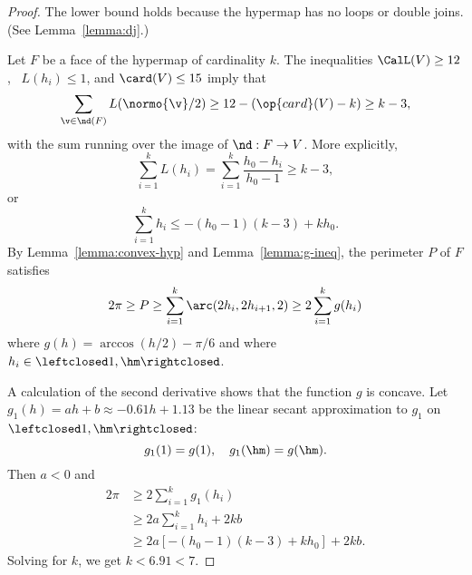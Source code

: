 \begin{proof} The lower bound holds because the hypermap has no loops
  or double joins.  (See Lemma~\ref{lemma:dj}.)  

Let $F$ be a face of the
  hypermap of cardinality $k$.  The inequalities $\CalL(V)\ge 12$,
 ~$L(h_i)\le1$, and $\card(V)\le 15$ 
imply that
\begin{equation}\label{eqn:L7}
\sum_{\v\in \nd(F)} L(\normo{\v}/2) \ge 12-(\op{card}(V)-k)\ge k-3,
\end{equation}
with the sum  running over the image of $\nd:F\to V$.
More explicitly,
\[
\sum_{i=1}^k L(h_i) = \sum_{i=1}^k \dfrac{h_0-h_i}{h_0-1} \ge k - 3,
\]
or
\[
\sum_{i=1}^k h_i \le -(h_0-1) (k-3) + k h_0.
\]
By Lemma~\ref{lemma:convex-hyp} and Lemma~\ref{lemma:g-ineq},
the perimeter $P$ of $F$ satisfies
\[
2\pi\ge P\ge
\sum_{i=1}^k \arc(2h_i,2h_{i+1},2)\ge 2\sum_{i=1}^k g(h_i)
\]
where $g(h) = \arccos(h/2)-\pi/6$ and
where $h_i\in \leftclosed 1,\hm\rightclosed$.

A calculation of the second derivative shows that the function $g$ is concave.
Let $g_1(h) = a h + b\approx -0.61 h + 1.13$ 
be the linear secant approximation to $g_1$ on 
$\leftclosed 1,\hm\rightclosed$:
\[
g_1(1) = g(1),\quad g_1(\hm) = g(\hm).
\]
Then $a<0$ and
\begin{align*}
2\pi &\ge 2\sum_{i=1}^k g_1(h_i) \\
   &\ge 2 a \sum_{i=1}^k h_i + 2 k b\\
   &\ge 2 a \left[ -(h_0-1) (k-3) + k h_0  \right] + 2 k b.
\end{align*}
Solving for $k$, we get $k< 6.91 < 7$.
%
\end{proof}



